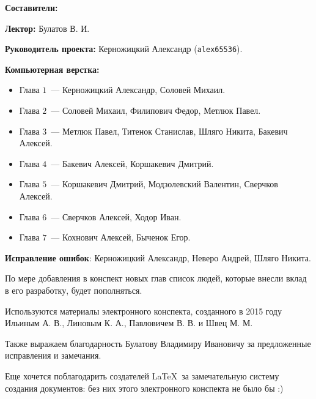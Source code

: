 \documentclass[../main.tex]{subfiles}
\begin{document}
{\Huge \bf Составители:}

\vspace{2em}

{
    \textbf{Лектор:} Булатов В. И.
    
    \smallskip
    
    \textbf{Руководитель проекта:} Керножицкий Александр 
    (\texttt{alex65536}).
    
    \smallskip
    
    \textbf{Компьютерная верстка:}
    \begin{itemize}
     \item Глава $1$~--- Керножицкий Александр, Соловей Михаил.
     \item Глава $2$~--- Соловей Михаил, Филипович Федор, Метлюк 
     Павел.
     \item Глава $3$~--- Метлюк Павел, Титенок Станислав, Шляго 
     Никита, Бакевич Алексей.
     \item Глава $4$~--- Бакевич Алексей, Коршакевич Дмитрий.
     \item Глава $5$~--- Коршакевич Дмитрий, Модзолевский 
     Валентин, Сверчков Алексей.
     \item Глава $6$~--- Сверчков Алексей, Ходор Иван.
     \item Глава $7$~--- Кохнович Алексей, Быченок Егор.
    \end{itemize}
    
    \textbf{Исправление ошибок}: Керножицкий Александр, Неверо 
    Андрей, Шляго Никита.
    
    \medskip
    
    По мере добавления в конспект новых глав список людей, которые 
    внесли вклад в его разработку, будет пополняться.
    
    \vspace{1.5em}
    
    Используются материалы электронного конспекта, созданного в 
    2015 году Ильиным А. В., Линовым К. А., Павловичем В. В. и 
    Швец М. М.

    \smallskip
    
    Также выражаем благодарность Булатову Владимиру Ивановичу за 
    предложенные исправления и замечания.
    
    \smallskip
    
    Еще хочется поблагодарить создателей \LaTeX\ за замечательную 
    систему создания документов: без них этого электронного 
    конспекта не было бы :)
}

\pagebreak
\end{document}
